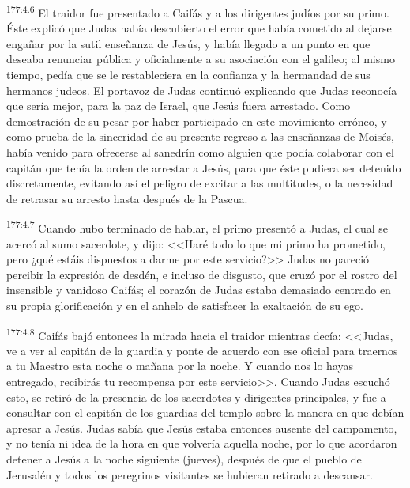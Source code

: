 \par 
\textsuperscript{177:4.6} El traidor fue presentado a Caifás y a los dirigentes judíos por su primo. Éste explicó que Judas había descubierto el error que había cometido al dejarse engañar por la sutil enseñanza de Jesús, y había llegado a un punto en que deseaba renunciar pública y oficialmente a su asociación con el galileo; al mismo tiempo, pedía que se le restableciera en la confianza y la hermandad de sus hermanos judeos. El portavoz de Judas continuó explicando que Judas reconocía que sería mejor, para la paz de Israel, que Jesús fuera arrestado. Como demostración de su pesar por haber participado en este movimiento erróneo, y como prueba de la sinceridad de su presente regreso a las enseñanzas de Moisés, había venido para ofrecerse al sanedrín como alguien que podía colaborar con el capitán que tenía la orden de arrestar a Jesús, para que éste pudiera ser detenido discretamente, evitando así el peligro de excitar a las multitudes, o la necesidad de retrasar su arresto hasta después de la Pascua.

\par 
\textsuperscript{177:4.7} Cuando hubo terminado de hablar, el primo presentó a Judas, el cual se acercó al sumo sacerdote, y dijo: <<Haré todo lo que mi primo ha prometido, pero ¿qué estáis dispuestos a darme por este servicio?>> Judas no pareció percibir la expresión de desdén, e incluso de disgusto, que cruzó por el rostro del insensible y vanidoso Caifás; el corazón de Judas estaba demasiado centrado en su propia glorificación y en el anhelo de satisfacer la exaltación de su ego.

\par 
\textsuperscript{177:4.8} Caifás bajó entonces la mirada hacia el traidor mientras decía: <<Judas, ve a ver al capitán de la guardia y ponte de acuerdo con ese oficial para traernos a tu Maestro esta noche o mañana por la noche. Y cuando nos lo hayas entregado, recibirás tu recompensa por este servicio>>. Cuando Judas escuchó esto, se retiró de la presencia de los sacerdotes y dirigentes principales, y fue a consultar con el capitán de los guardias del templo sobre la manera en que debían apresar a Jesús. Judas sabía que Jesús estaba entonces ausente del campamento, y no tenía ni idea de la hora en que volvería aquella noche, por lo que acordaron detener a Jesús a la noche siguiente (jueves), después de que el pueblo de Jerusalén y todos los peregrinos visitantes se hubieran retirado a descansar.

